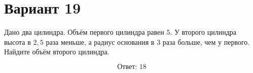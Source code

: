 \documentclass[12pt,a4paper]{article}
\begin{document}
\section*{Вариант 19}

Дано два цилиндра. Объём первого цилиндра равен \(5\).
У второго цилиндра высота в \(2{,}5\) раза меньше,
а радиус основания в \(3\) раза больше, чем у первого.
Найдите объём второго цилиндра.

\begin{center}
\end{center}

\[
\boxed{\text{Ответ: }18}
\]
\end{document}
